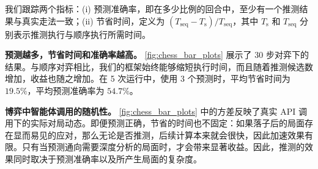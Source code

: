 我们跟踪两个指标：(i) 预测准确率，即在多少比例的回合中，至少有一个推测结果与真实走法一致；(ii) 节省时间，定义为 $(T_{\mathrm{seq}}-T_{\mathrm{s}})/T_{\mathrm{seq}}$，其中 $T_{\mathrm{s}}$ 和 $T_{\mathrm{seq}}$ 分别表示推测执行与顺序执行所需时间。

\textbf{预测越多，节省时间和准确率越高。}
\cref{fig:chess_bar_plots} 展示了 30 步对弈下的结果。与顺序对弈相比，我们的框架始终能够缩短执行时间，而且随着推测候选数增加，收益也随之增加。在 5 次运行中，使用 3 个预测时，平均节省时间为 $19.5\%$，平均预测准确率为 $54.7\%$。

\textbf{博弈中智能体调用的随机性。}
\cref{fig:chess_bar_plots} 中的方差反映了真实 API 调用下的实际对局动态。即便预测正确，节省的时间也不固定：如果落子后的局面存在显而易见的应对，那么无论是否推测，后续计算本来就会很快，因此加速效果有限。只有当预测通向需要深度分析的局面时，才会带来显著收益。因此，推测的效果同时取决于预测准确率以及所产生局面的复杂度。
